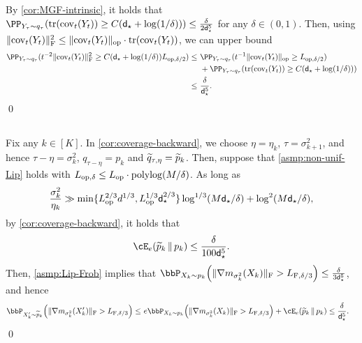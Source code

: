 \subsection{}

By \cref{cor:MGF-intrinsic}, it holds that $\PP_{Y_\tau\sim q_\tau}(\tr(\cov_t(Y_t))\geq C(\dstar+\log(1/\delta)))\leq \frac{\delta}{2\dstar^5}$ for any $\delta\in(0,1)$. Then, using $\lVert\mathrm{cov}_t(Y_t)\rVert_{\mathrm{F}}^2\leq \lVert\mathrm{cov}_t(Y_t)\|_{\mathrm{op}}\cdot \mathrm{tr}(\mathrm{cov}_t(Y_t))$, we can upper bound
\begin{align*}
    \PP_{Y_\tau\sim q_\tau}(t^{-2}\nrmF{\cov_t(Y_t)}^2\geq C(\dstar+\log(1/\delta))\Lipop[\delta/2])
    \leq&~ \PP_{Y_\tau\sim q_\tau}(t^{-1}\nrmop{\cov_t(Y_t)}\geq \Lipop[\delta/2]) \\
    &~ +\PP_{Y_\tau\sim q_\tau}(\tr(\cov_t(Y_t))\geq C(\dstar+\log(1/\delta)))\\
    \leq&~ \frac{\delta}{\dstar^5}.
\end{align*}
\qed



\subsection{}

Fix any $k\in[K]$.
In \cref{cor:coverage-backward}, we choose $\eta=\eta_k$, $\tau=\sigma_{k+1}^2$, and hence $\tau-\eta=\sigma_k^2$, $q_{\tau-\eta}=p_k$ and $\widetilde{q}_{\tau,\eta}=\widetilde{p}_k$. Then, suppose that \cref{asmp:non-unif-Lip} holds with $L_{\mathrm{op},\delta}\leq L_{\rm op}\cdot \mathrm{polylog}(M/\delta)$. As long as 
\begin{align*}
    \frac{\sigma_k^2}{\eta_k}\gg \min\{ L_{\rm op}^{2/3}d^{1/3}, L_{\rm op}^{1/3}\mathsf{d}_\star^{2/3} \} \log^{1/3}(M\mathsf{d}_\star/\delta)+\log^2(M\mathsf{d}_\star/\delta),
\end{align*}
by \cref{cor:coverage-backward}, it holds that
\begin{align*}
    \Dcov[e]{\wt{p}_k}{p_k}\leq \frac{\delta}{100\dstar^5}.
\end{align*}
Then, \cref{asmp:Lip-Frob} implies that $\bbP_{X_k\sim p_k}\prn[\Big]{ \nrmF{\nabla m_{\sigma_k^2}(X_k)}> \LipF[\delta/3] }\leq \frac{\delta}{3\dstar^5}$, and hence
\begin{align}
    \bbP_{X_k'\sim \wt{p}_k}\prn[\Big]{ \nrmF{\nabla m_{\sigma_k^2}(X_k')}> \LipF[\delta/3] }\leq&~
    e \bbP_{X_k\sim p_k}\prn[\Big]{ \nrmF{\nabla m_{\sigma_k^2}(X_k)}> \LipF[\delta/3] } + \Dcov[e]{\wt{p}_k}{p_k}\leq 
     \frac{\delta}{\dstar^5}.
\end{align}
\qed



